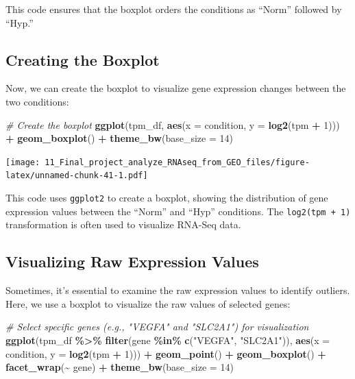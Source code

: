 \documentclass[
]{book}
\newenvironment{Shaded}{\begin{snugshade}}{\end{snugshade}}
\newcommand{\AttributeTok}[1]{\textcolor[rgb]{0.13,0.29,0.53}{#1}}
\newcommand{\CommentTok}[1]{\textcolor[rgb]{0.56,0.35,0.01}{\textit{#1}}}
\newcommand{\DecValTok}[1]{\textcolor[rgb]{0.00,0.00,0.81}{#1}}
\newcommand{\FunctionTok}[1]{\textcolor[rgb]{0.13,0.29,0.53}{\textbf{#1}}}
\newcommand{\NormalTok}[1]{#1}
\newcommand{\SpecialCharTok}[1]{\textcolor[rgb]{0.81,0.36,0.00}{\textbf{#1}}}
\newcommand{\StringTok}[1]{\textcolor[rgb]{0.31,0.60,0.02}{#1}}
\begin{document}
This code ensures that the boxplot orders the conditions as ``Norm'' followed by ``Hyp.''

\hypertarget{creating-the-boxplot}{%
\subsection{Creating the Boxplot}\label{creating-the-boxplot}}

Now, we can create the boxplot to visualize gene expression changes between the two conditions:

\begin{Shaded}
\begin{Highlighting}[]
\CommentTok{\# Create the boxplot}
\FunctionTok{ggplot}\NormalTok{(tpm\_df, }\FunctionTok{aes}\NormalTok{(}\AttributeTok{x =}\NormalTok{ condition, }\AttributeTok{y =} \FunctionTok{log2}\NormalTok{(tpm }\SpecialCharTok{+} \DecValTok{1}\NormalTok{))) }\SpecialCharTok{+}
  \FunctionTok{geom\_boxplot}\NormalTok{() }\SpecialCharTok{+}
  \FunctionTok{theme\_bw}\NormalTok{(}\AttributeTok{base\_size =} \DecValTok{14}\NormalTok{)}
\end{Highlighting}
\end{Shaded}

\texttt{[image: 11\_Final\_project\_analyze\_RNAseq\_from\_GEO\_files/figure-latex/unnamed-chunk-41-1.pdf]}

This code uses \texttt{ggplot2} to create a boxplot, showing the distribution of gene expression values between the ``Norm'' and ``Hyp'' conditions. The \texttt{log2(tpm\ +\ 1)} transformation is often used to visualize RNA-Seq data.

\hypertarget{visualizing-raw-expression-values}{%
\subsection{Visualizing Raw Expression Values}\label{visualizing-raw-expression-values}}

Sometimes, it's essential to examine the raw expression values to identify outliers. Here, we use a boxplot to visualize the raw values of selected genes:

\begin{Shaded}
\begin{Highlighting}[]
\CommentTok{\# Select specific genes (e.g., "VEGFA" and "SLC2A1") for visualization}
\FunctionTok{ggplot}\NormalTok{(tpm\_df }\SpecialCharTok{\%\textgreater{}\%}
         \FunctionTok{filter}\NormalTok{(gene }\SpecialCharTok{\%in\%} \FunctionTok{c}\NormalTok{(}\StringTok{"VEGFA"}\NormalTok{, }\StringTok{"SLC2A1"}\NormalTok{)), }
       \FunctionTok{aes}\NormalTok{(}\AttributeTok{x =}\NormalTok{ condition, }\AttributeTok{y =} \FunctionTok{log2}\NormalTok{(tpm }\SpecialCharTok{+} \DecValTok{1}\NormalTok{))) }\SpecialCharTok{+}
  \FunctionTok{geom\_point}\NormalTok{() }\SpecialCharTok{+}
  \FunctionTok{geom\_boxplot}\NormalTok{() }\SpecialCharTok{+}
  \FunctionTok{facet\_wrap}\NormalTok{(}\SpecialCharTok{\textasciitilde{}}\NormalTok{ gene) }\SpecialCharTok{+} 
  \FunctionTok{theme\_bw}\NormalTok{(}\AttributeTok{base\_size =} \DecValTok{14}\NormalTok{)}
\end{Highlighting}
\end{Shaded}
\end{document}
